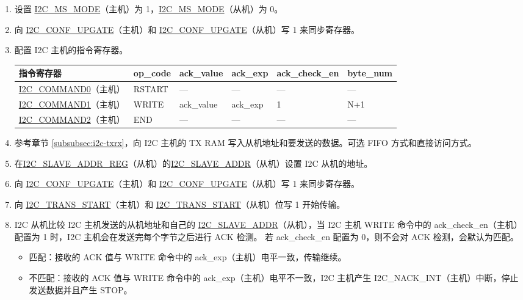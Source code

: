 \documentclass[main\_\_CN.tex]{subfiles}
\begin{document}
\begin{enumerate}
\item 设置 \hyperref[fielddesc:I2CMSMODE]{I2C\_MS\_MODE}（主机）为 1，\hyperref[fielddesc:I2CMSMODE]{I2C\_MS\_MODE}（从机）为 0。
\item 向 \hyperref[fielddesc:I2CCONFUPGATE]{I2C\_CONF\_UPGATE}（主机）和 \hyperref[fielddesc:I2CCONFUPGATE]{I2C\_CONF\_UPGATE}（从机）写 1 来同步寄存器。
\item 配置 I2C 主机的指令寄存器。
\begin{longtable}{ | p{4cm} | p{2cm} | p{2cm} | p{2cm} |p{2cm} | p{2cm} |}
\hline\rowcolor{lightgray}
指令寄存器& op\_code & ack\_value&ack\_exp&ack\_check\_en&byte\_num  \\ \hline
\hyperref[fielddesc:I2CCOMMAND0]{I2C\_COMMAND0}（主机）& RSTART& ---&---&---&---  \\ \hline
\hyperref[fielddesc:I2CCOMMAND1]{I2C\_COMMAND1}（主机）& WRITE& ack\_value&ack\_exp&1&N+1  \\ \hline
\hyperref[fielddesc:I2CCOMMAND2]{I2C\_COMMAND2}（主机）& END& ---&---&---&---  \\ \hline
\end{longtable}
\item 参考章节 \ref{subsubsec:i2c-txrx}，向 I2C 主机的 TX RAM 写入从机地址和要发送的数据。可选 FIFO 方式和直接访问方式。
\item 在\hyperref[regdesc:I2CSLAVEADDRREG]{I2C\_SLAVE\_ADDR\_REG}（从机）的\hyperref[fielddesc:I2CSLAVEADDR]{I2C\_SLAVE\_ADDR}（从机）设置 I2C 从机的地址。
\item 向 \hyperref[fielddesc:I2CCONFUPGATE]{I2C\_CONF\_UPGATE}（主机）和 \hyperref[fielddesc:I2CCONFUPGATE]{I2C\_CONF\_UPGATE}（从机）写 1 来同步寄存器。
\item 向 \hyperref[fielddesc:I2CTRANSSTART]{I2C\_TRANS\_START}（主机）和 \hyperref[fielddesc:I2CTRANSSTART]{I2C\_TRANS\_START}（从机）位写 1 开始传输。
\item I2C 从机比较 I2C 主机发送的从机地址和自己的 \hyperref[fielddesc:I2CSLAVEADDR]{I2C\_SLAVE\_ADDR}（从机），当 I2C 主机 WRITE 命令中的 ack\_check\_en（主机）配置为 1 时，I2C 主机会在发送完每个字节之后进行 ACK 检测。 若 ack\_check\_en 配置为 0，则不会对 ACK 检测，会默认为匹配。
\begin{itemize}
\item 匹配：接收的 ACK 值与 WRITE 命令中的 ack\_exp（主机）电平一致，传输继续。
\item 不匹配：接收的 ACK 值与 WRITE 命令中的 ack\_exp（主机）电平不一致，I2C 主机产生 I2C\_NACK\_INT（主机）中断，停止发送数据并且产生 STOP。
\end{itemize}


\end{enumerate}
\end{document}
